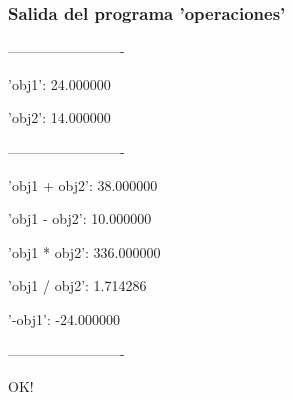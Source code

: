 \subsubsection{Salida del programa 'operaciones'}
\textsf{-------------------------}\par
\textsf{'obj1': 24.000000}\par
\textsf{'obj2': 14.000000}\par
\textsf{-------------------------}\par
\textsf{'obj1 + obj2': 38.000000}\par
\textsf{'obj1 - obj2': 10.000000}\par
\textsf{'obj1 * obj2': 336.000000}\par
\textsf{'obj1 / obj2': 1.714286}\par
\textsf{'-obj1': -24.000000}\par
\textsf{-------------------------}\par
\textsf{OK!}




  

